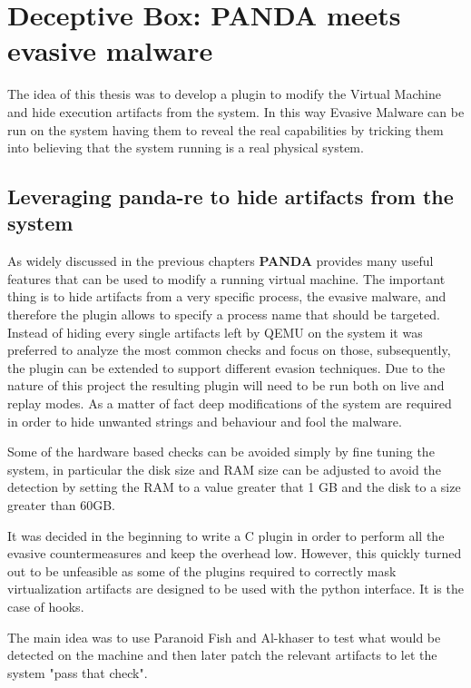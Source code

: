 \chapter{Deceptive Box: PANDA meets evasive malware}

The idea of this thesis was to develop a plugin to modify the Virtual Machine and hide execution artifacts from the system. In this way Evasive Malware can be run on the system having them to reveal the real capabilities by tricking them into believing that the system running is a real physical system.

\section{Leveraging panda-re to hide artifacts from the system}

As widely discussed in the previous chapters \textbf{PANDA} provides many useful features that can be used to modify a running virtual machine. The important thing is to hide artifacts from a very specific process, the evasive malware, and therefore the plugin allows to specify a process name that should be targeted. Instead of hiding every single artifacts left by QEMU on the system it was preferred to analyze the most common checks and focus on those, subsequently, the plugin can be extended to support different evasion techniques. Due to the nature of this project the resulting plugin will need to be run both on live and replay modes. As a matter of fact deep modifications of the system are required in order to hide unwanted strings and behaviour and fool the malware.

Some of the hardware based checks can be avoided simply by fine tuning the system, in particular the disk size and RAM size can be adjusted to avoid the detection by setting the RAM to a value greater that 1 GB and the disk to a size greater than 60GB. 

It was decided in the beginning to write a C plugin in order to perform all the evasive countermeasures and keep the overhead low. However, this quickly turned out to be unfeasible as some of the plugins required to correctly mask virtualization artifacts are designed to be used with the python interface. It is the case of hooks.

The main idea was to use Paranoid Fish and Al-khaser to test what would be detected on the machine and then later patch the relevant artifacts to let the system "pass that check". 

